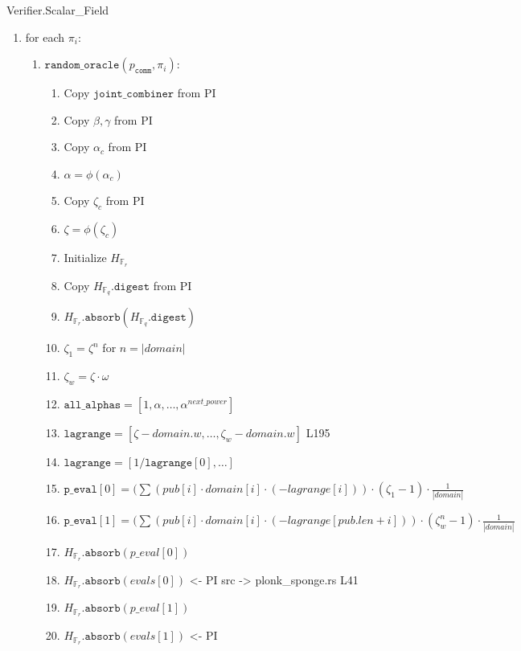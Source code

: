 \begin{algorithm}[H]
\caption{Verifier.Scalar\_Field}
\begin{enumerate}
	\item for each $\pi_i$:
		\begin{enumerate}
			\item $\texttt{random\_oracle}(p_{\texttt{comm}}, \pi_i)$:
            \begin{enumerate}
				\item Copy $\texttt{joint\_combiner}$ from PI
				\item Copy $\beta, \gamma$ from PI
				\item Copy $\alpha_c$ from PI
                \item $\alpha = \phi(\alpha_c)$
				\item Copy $\zeta_c$ from PI
                \item $\zeta = \phi(\zeta_c)$
                \item Initialize $H_{\mathbb{F}_r}$
                \item Copy $H_{\mathbb{F}_q}.\texttt{digest}$ from PI
                \item $H_{\mathbb{F}_r}.\texttt{absorb}(H_{\mathbb{F}_q}.\texttt{digest})$
                \item $\zeta_1 = \zeta^{n}$ for $n = |domain|$
                \item $\zeta_w = \zeta \cdot \omega$
				\item $\texttt{all\_alphas} = [1, \alpha, \dots, \alpha^{next\_power}]$
				\item $\texttt{lagrange} = [\zeta - domain.w, \dots, \zeta_w - domain.w]$ L195
				\item $\texttt{lagrange} = [1 / \texttt{lagrange}[0], \dots]$
				\item $\texttt{p\_eval}[0] = (\sum(pub[i] \cdot domain[i] \cdot (-lagrange[i])) 
													\cdot (\zeta_1 - 1) \cdot \frac{1}{|domain|}$
				\item $\texttt{p\_eval}[1] = (\sum(pub[i] \cdot domain[i] \cdot (-lagrange[pub.len + i])) 
													\cdot (\zeta_w^{n} - 1) \cdot \frac{1}{|domain|}$
				\item $H_{\mathbb{F}_r}.\texttt{absorb}(p\_eval[0])$
				\item $H_{\mathbb{F}_r}.\texttt{absorb}(evals[0])$ <- PI src -> plonk\_sponge.rs L41
				\item $H_{\mathbb{F}_r}.\texttt{absorb}(p\_eval[1])$
				\item $H_{\mathbb{F}_r}.\texttt{absorb}(evals[1])$ <- PI

\end{enumerate}
\end{enumerate}
\end{enumerate}
\end{algorithm}
